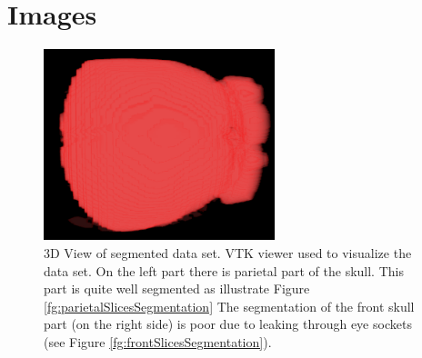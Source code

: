 ﻿\chapter{Images}

\begin{figure}[h]
    \centering
    \includegraphics[width=0.6\textwidth]{data/png/3d}
    \caption[3D view of segmented skull data set]
{
3D View of segmented data set.
VTK viewer used to visualize the data set.
On the left part there is parietal part of the skull.
This part is quite well segmented as illustrate Figure \ref{fg:parietalSlicesSegmentation}
The segmentation of the front skull part (on the right side) is poor due to leaking through eye sockets (see Figure \ref{fg:frontSlicesSegmentation}).
}
    \label{fg:series3d}
\end{figure}


